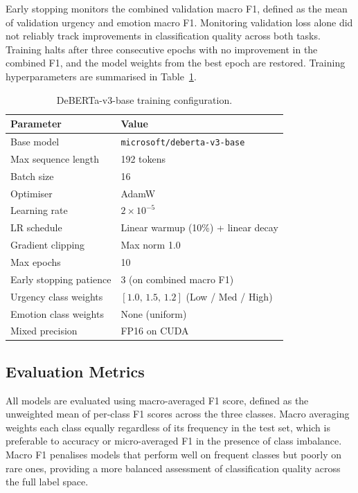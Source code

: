 \documentclass[11pt]{article}
\begin{document}
Early stopping monitors the combined validation macro F1, defined as the mean of
validation urgency and emotion macro F1. Monitoring validation loss alone did not
reliably track improvements in classification quality across both tasks. Training halts
after three consecutive epochs with no improvement in the combined F1, and the model
weights from the best epoch are restored. Training hyperparameters are summarised in
Table~\ref{tab:training}.

\begin{table}[H]
  \centering
  \small
  \begin{tabular}{ll}
    \toprule
    \textbf{Parameter} & \textbf{Value} \\
    \midrule
    Base model             & \texttt{microsoft/deberta-v3-base} \\
    Max sequence length    & 192 tokens \\
    Batch size             & 16 \\
    Optimiser              & AdamW \\
    Learning rate          & $2{\times}10^{-5}$ \\
    LR schedule            & Linear warmup (10\%) + linear decay \\
    Gradient clipping      & Max norm 1.0 \\
    Max epochs             & 10 \\
    Early stopping patience & 3 (on combined macro F1) \\
    Urgency class weights  & $[1.0,\,1.5,\,1.2]$ (Low / Med / High) \\
    Emotion class weights  & None (uniform) \\
    Mixed precision        & FP16 on CUDA \\
    \bottomrule
  \end{tabular}
  \caption{DeBERTa-v3-base training configuration.}
  \label{tab:training}
\end{table}

\subsection{Evaluation Metrics}

All models are evaluated using macro-averaged F1 score, defined as the unweighted mean
of per-class F1 scores across the three classes. Macro averaging weights each class
equally regardless of its frequency in the test set, which is preferable to accuracy
or micro-averaged F1 in the presence of class imbalance. Macro F1 penalises models
that perform well on frequent classes but poorly on rare ones, providing a more
balanced assessment of classification quality across the full label space.
\end{document}
